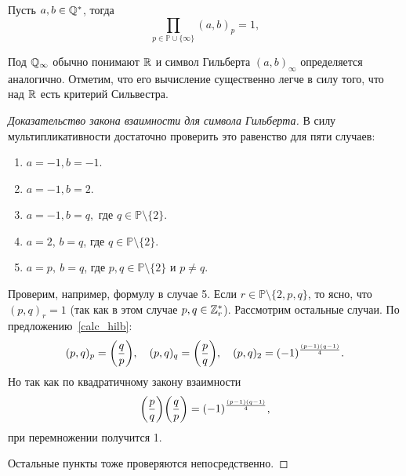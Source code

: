 		\begin{theorem}\label{Hilbert_reciprocity} 
			Пусть $a, b \in \mathbb{Q}^{*}$, тогда 
			\[
				\prod_{p \in \mathbb{P} \cup \{ \infty \}} (a, b)_{p} = 1,
			\]
		\end{theorem}

		\begin{remark}
			Под $\mathbb{Q}_{\infty}$ обычно понимают $\mathbb{R}$ и символ Гильберта $(a, b)_{\infty}$ определяется аналогично. Отметим, что его вычисление существенно легче в силу того, что над $\mathbb{R}$ есть критерий Сильвестра. 
		\end{remark}

		\begin{proof}[Доказательство закона взаимности для символа Гильберта]
			В силу мультипликативности достаточно проверить это равенство для пяти случаев: 
			\begin{enumerate}
				\item $a = -1, b = -1$.
				\item $a = -1, b = 2$.
				\item $a = -1, b = q, $ где $q \in \mathbb{P} \setminus \{ 2 \}$. 
				\item $a = 2$, $b = q$, где $q \in \mathbb{P} \setminus \{ 2 \}$.
				\item $a = p, \ b = q$, где $p, q \in \mathbb{P} \setminus \{ 2 \}$ и $p \neq q$.
			\end{enumerate}
			Проверим, например, формулу в случае 5. Если  $r \in \mathbb{P} \setminus \{ 2, p, q \}$, то ясно, что $(p, q)_{r} = 1$ (так как в этом случае $p, q \in \mathbb{Z}_{r}^{*}$). 
			Рассмотрим остальные случаи. По предложению~\ref{calc_hilb}:
			\[
				(p, q)_{p} = \lr*{\frac{q}{p}}, \quad (p, q)_{q} = \lr*{\frac{p}{q}}, \quad (p, q)_{2} = (-1)^{\frac{(p - 1)(q - 1)}{4}}.
			\]
			Но так как по квадратичному закону взаимности
			\[
				\lr*{\frac{p}{q}}\lr*{\frac{q}{p}} = (-1)^{\frac{(p - 1)(q - 1)}{4}},
			\]
			при перемножении получится 1. 

			Остальные пункты тоже проверяются непосредственно. 
		\end{proof}
	



	


	 




